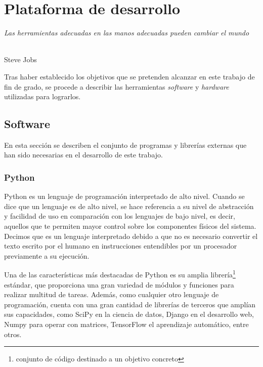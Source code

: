\chapter{Plataforma de desarrollo}
\label{cap:capitulo4}

\begin{flushright}
\begin{minipage}[]{10cm}
\emph{Las herramientas adecuadas en las manos adecuadas pueden cambiar el mundo}\\
\end{minipage}\\
Steve Jobs\\
\end{flushright}

\vspace{1cm}
\noindent Tras haber establecido los objetivos que se pretenden alcanzar en este trabajo de fin de grado, se procede a describir
las herramientas \textit{software} y \textit{hardware} utilizadas para lograrlos. 

\section{Software}
\label{sec:software}
\noindent En esta sección se describen el conjunto de programas y librerías externas que han sido necesarias en el desarrollo de este trabajo.
\subsection{Python}
\label{subsec:pyhton}
\noindent Python es un lenguaje de programación interpretado de alto nivel. Cuando se dice que un lenguaje es de alto nivel, se hace referencia a su nivel de 
abstracción y facilidad de uso en comparación con los lenguajes de bajo nivel, es decir, aquellos que te permiten mayor control sobre los 
componentes físicos del sistema. Decimos que es un lenguaje interpretado debido a que no es necesario convertir el texto escrito por el humano en 
instrucciones entendibles por un procesador previamente a su ejecución.  

Una de las características más destacadas de Python es su amplia librería\footnote{conjunto de código destinado a un objetivo concreto} estándar, que proporciona 
una gran variedad de módulos y funciones para realizar multitud de tareas. Además, como cualquier otro lenguaje de programación, cuenta con una gran cantidad de librerías de terceros que 
amplían sus capacidades, como SciPy en la ciencia de datos, Django en el desarrollo web, Numpy para operar con matrices, TensorFlow el aprendizaje automático, entre otros.

